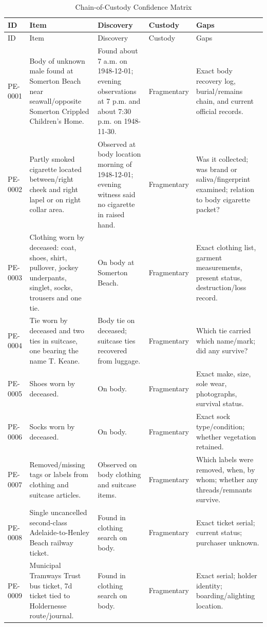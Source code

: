 \begin{longtable}{p{}p{}p{}p{}p{}}
\caption{Chain-of-Custody Confidence Matrix}\label{tab:chain-of-custody}\\
\toprule
ID & Item & Discovery & Custody & Gaps \\
\midrule
\endfirsthead
\toprule
ID & Item & Discovery & Custody & Gaps \\
\midrule
\endhead
PE-0001 & Body of unknown male found at Somerton Beach near seawall/opposite Somerton Crippled Children's Home. & Found about 7 a.m. on 1948-12-01; evening observations at 7 p.m. and about 7:30 p.m. on 1948-11-30. & Fragmentary & Exact body recovery log, burial/remains chain, and current official records. \\
PE-0002 & Partly smoked cigarette located between/right cheek and right lapel or on right collar area. & Observed at body location morning of 1948-12-01; evening witness said no cigarette in raised hand. & Fragmentary & Was it collected; was brand or saliva/fingerprint examined; relation to body cigarette packet? \\
PE-0003 & Clothing worn by deceased: coat, shoes, shirt, pullover, jockey underpants, singlet, socks, trousers and one tie. & On body at Somerton Beach. & Fragmentary & Exact clothing list, garment measurements, present status, destruction/loss record. \\
PE-0004 & Tie worn by deceased and two ties in suitcase, one bearing the name T. Keane. & Body tie on deceased; suitcase ties recovered from luggage. & Fragmentary & Which tie carried which name/mark; did any survive? \\
PE-0005 & Shoes worn by deceased. & On body. & Fragmentary & Exact make, size, sole wear, photographs, survival status. \\
PE-0006 & Socks worn by deceased. & On body. & Fragmentary & Exact sock type/condition; whether vegetation retained. \\
PE-0007 & Removed/missing tags or labels from clothing and suitcase articles. & Observed on body clothing and suitcase items. & Fragmentary & Which labels were removed, when, by whom; whether any threads/remnants survive. \\
PE-0008 & Single uncancelled second-class Adelaide-to-Henley Beach railway ticket. & Found in clothing search on body. & Fragmentary & Exact ticket serial; current status; purchaser unknown. \\
PE-0009 & Municipal Tramways Trust bus ticket, 7d ticket tied to Holdernesse route/journal. & Found in clothing search on body. & Fragmentary & Exact serial; holder identity; boarding/alighting location. \\

\end{longtable}
